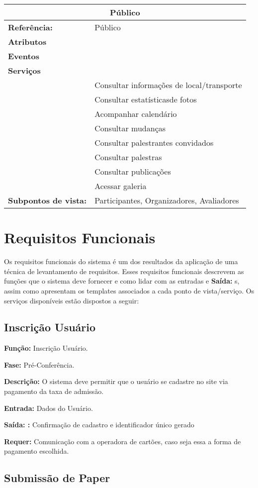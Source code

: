 \documentclass[letter]{article}
\begin{document}
%
\begin{table}
\begin{tabular}{|ll|}
\hline 
\multicolumn{2}{|c|}{\textbf{Público}}\tabularnewline
\hline
\textbf{Referência:} &  Público\tabularnewline
\textbf{Atributos} & \tabularnewline
\textbf{Eventos} & \tabularnewline
\textbf{Serviços} & \tabularnewline
 & Consultar informações de local/transporte\tabularnewline
 & Consultar estatísticasde fotos\tabularnewline
 & Acompanhar calendário \tabularnewline
 & Consultar mudanças\tabularnewline
 & Consultar palestrantes convidados\tabularnewline
 & Consultar palestras\tabularnewline
 & Consultar publicações\tabularnewline
 & Acessar galeria\tabularnewline
\textbf{Subpontos de vista:} & Participantes, Organizadores, Avaliadores \tabularnewline
\hline
\end{tabular}


\end{table}

\section{Requisitos Funcionais}

Os requisitos funcionais do sistema é um dos resultados da aplicação de uma técnica de levantamento de requisitos. Esses requisitos funcionais descrevem as funções que o sistema deve fornecer e como lidar com as entradas e \textbf{Saída:} s, assim como apresentam os templates associados a cada ponto de vista/serviço. Os serviços disponíveis estão dispostos a seguir:

\subsection{Inscrição Usuário}

\textbf{Função:} Inscrição Usuário.

\textbf{Fase: } Pré-Conferência.

\textbf{Descrição: } O sistema deve permitir que o usuário se cadastre no site via pagamento da taxa de admissão.

\textbf{Entrada: } Dados do Usuário.

\textbf{Saída: :} Confirmação de cadastro e identificador único gerado

\textbf{Requer:} Comunicação com a operadora de cartões, caso seja essa a
forma de pagamento escolhida.



\subsection{ Submissão de Paper}
\end{document}
